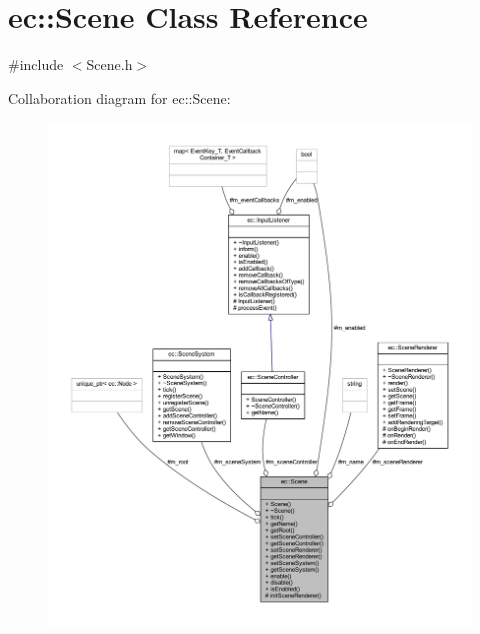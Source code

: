 \hypertarget{classec_1_1_scene}{}\section{ec\+:\+:Scene Class Reference}
\label{classec_1_1_scene}


{\ttfamily \#include $<$Scene.\+h$>$}



Collaboration diagram for ec\+:\+:Scene\+:\nopagebreak
\begin{figure}[H]
\begin{center}
\leavevmode
\includegraphics[width=350pt]{classec_1_1_scene__coll__graph}
\end{center}
\end{figure}
